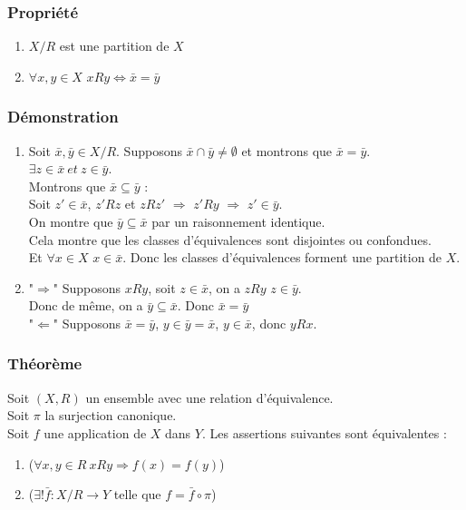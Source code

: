 \documentclass[a4paper, oneside]{report}
\theoremstyle{break}
\begin{document}
\subsubsection{Propriété}
\begin{enumerate}
\item $X/R$ est une partition de $X$
\item $\forall x,y\in X$ $xRy\Leftrightarrow \bar{x}=\bar{y}$
\end{enumerate}

\subsubsection{Démonstration}
\begin{enumerate}
\item Soit $\bar{x},\bar{y}\in X/R$. Supposons $\bar{x}\cap \bar{y}\neq \emptyset$ et montrons que $\bar{x}=\bar{y}$.\\
$\exists z\in \bar{x}~et~z\in \bar{y}$.\\
Montrons que $\bar{x}\subseteq \bar{y}$ :\\
Soit $z'\in \bar{x}$, $z'Rz$ et $zRz'$ $\Rightarrow$ $z'Ry$ $\Rightarrow$ $z'\in \bar{y}$.\\
On montre que $\bar{y}\subseteq \bar{x}$ par un raisonnement identique.\\
Cela montre que les classes d'équivalences sont disjointes ou confondues.\\
Et $\forall x\in X$ $x\in \bar{x}$. Donc les classes d'équivalences forment une partition de $X$.\\

\item "$\Rightarrow$" Supposons $xRy$, soit $z\in \bar{x}$, on a $ zRy$ $z\in \bar{y}$.\\
Donc de même, on a $\bar{y}\subseteq \bar{x}$. Donc $\bar{x}=\bar{y}$\\
"$\Leftarrow$" Supposons $\bar{x}=\bar{y}$, $y\in \bar{y}=\bar{x}$, $y\in \bar{x}$, donc $yRx$.
\end{enumerate}

\subsubsection{Théorème}
Soit $(X,R)$ un ensemble avec une relation d'équivalence.\\
Soit $\pi$ la surjection canonique.\\
Soit $f$ une application de $X$ dans $Y$. Les assertions suivantes sont équivalentes :
\begin{enumerate}
\item ($\forall x,y \in R~xRy\Rightarrow f(x)=f(y)$)
\item ($\exists ! \bar{f}: X/R \rightarrow Y$ telle que $f=\bar{f}\circ \pi$)
\end{enumerate}
\end{document}
